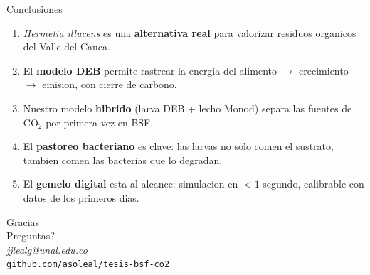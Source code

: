 \documentclass[aspectratio=169,11pt]{beamer}
\begin{document}
\begin{frame}{Conclusiones}
  \begin{enumerate}
    \item \textit{Hermetia illucens} es una \textbf{alternativa real} para valorizar residuos organicos del Valle del Cauca.
    \item El \textbf{modelo DEB} permite rastrear la energia del alimento $\rightarrow$ crecimiento $\rightarrow$ emision, con cierre de carbono.
    \item Nuestro modelo \textbf{hibrido} (larva DEB + lecho Monod) separa las fuentes de CO$_2$ por primera vez en BSF.
    \item El \textbf{pastoreo bacteriano} es clave: las larvas no solo comen el sustrato, tambien comen las bacterias que lo degradan.
    \item El \textbf{gemelo digital} esta al alcance: simulacion en $<1$ segundo, calibrable con datos de los primeros dias.
  \end{enumerate}
\end{frame}

\begin{frame}
  \vspace{1.5cm}
  \centering
  {\Huge\textcolor{verdehoja}{Gracias}}\\[0.8cm]
  
  {\normalsize\textcolor{marronlarva}{Preguntas?}}\\[1cm]
  
  {\small \textit{jjlealg@unal.edu.co}}\\[0.2cm]
  {\footnotesize\texttt{github.com/asoleal/tesis-bsf-co2}}\\[0.5cm]
  
\end{frame}
\end{document}
